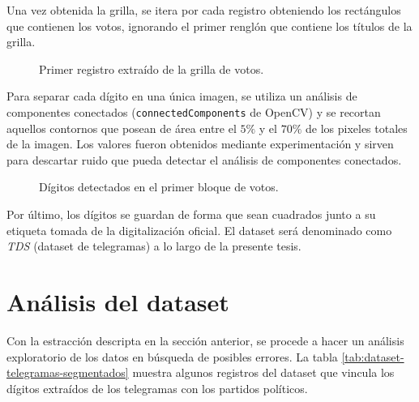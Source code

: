 Una vez obtenida la grilla, se itera por cada registro obteniendo los rect\'angulos que contienen los votos, ignorando
el primer rengl\'on que contiene los t\'itulos de la grilla.

\begin{figure}[H]
    \centering
    \caption{Primer registro extra\'ido de la grilla de votos.}
    \label{fig:etl-4-registro}
\end{figure}

Para separar cada d\'igito en una \'unica imagen, se utiliza un an\'alisis de componentes conectados
(\verb|connectedComponents| de OpenCV) y se recortan aquellos contornos que posean de \'area entre el $5\%$ y el $70\%$
de los pixeles totales de la imagen. Los valores fueron obtenidos mediante experimentaci\'on y sirven para descartar
ruido que pueda detectar el an\'alisis de componentes conectados.

\begin{figure}[H]
    \centering
    \caption{D\'igitos detectados en el primer bloque de votos.}
    \label{fig:etl-4-digitos}
\end{figure}

Por \'ultimo, los d\'igitos se guardan de forma que sean cuadrados junto a su etiqueta tomada de la digitalizaci\'on
oficial. El dataset ser\'a denominado como {\it TDS} (dataset de telegramas) a lo largo de la presente tesis.

\section{An\'alisis del dataset}

Con la estracci\'on descripta en la secci\'on anterior, se procede a hacer un an\'alisis exploratorio de los datos en
b\'usqueda de posibles errores. La tabla \ref{tab:dataset-telegramas-segmentados} muestra algunos registros del dataset
que vincula los d\'igitos extra\'idos de los telegramas con los partidos pol\'iticos.

